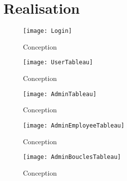 \section{Realisation}%

\blindtext
\begin{figure}[ht!] %
  \centering
  \texttt{[image: Login]}
  \caption[Login]{Conception}%
  \label{fig:Login}
\end{figure}

\begin{figure}[ht!] %
  \centering
  \texttt{[image: UserTableau]}
  \caption[UserClientsTable]{Conception}%
  \label{fig:UserTable}
\end{figure}

\begin{figure}[ht!] %
  \centering
  \texttt{[image: AdminTableau]}
  \caption[AdminClientsTable]{Conception}%
  \label{fig:AdminClientsTable}
\end{figure}

\begin{figure}[ht!] %
  \centering
  \texttt{[image: AdminEmployeeTableau]}
  \caption[AdminEmployeeTable]{Conception}%
  \label{fig:AdminEmployeeTable}
\end{figure}

\begin{figure}[ht!] %
  \centering
  \texttt{[image: AdminBouclesTableau]}
  \caption[AdminBouclesTable]{Conception}%
  \label{fig:AdminBouclesTable}
\end{figure}

